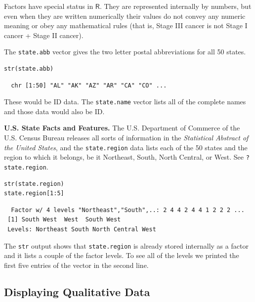 \documentclass[captions=tableheading]{scrbook}
\begin{document}
Factors have special status in \(\mathsf{R}\). They are represented internally by numbers, but even when they are written numerically their values do not convey any numeric meaning or obey any mathematical rules (that is, Stage III cancer is not Stage I cancer + Stage II cancer).

\begin{example}
The \texttt{state.abb}
vector gives the two letter postal abbreviations for all 50 states.


\begin{verbatim}
str(state.abb)
\end{verbatim}

\begin{verbatim}
  chr [1:50] "AL" "AK" "AZ" "AR" "CA" "CO" ...
\end{verbatim}

These would be ID data. The \texttt{state.name} vector lists all of the complete names and those data would also be ID.
\end{example}

\begin{example}
\textbf{U.S. State Facts and Features.} The U.S. Department of Commerce of the U.S. Census Bureau releases all sorts of information in the \emph{Statistical Abstract of the United States}, and the \texttt{state.region} data lists each of the 50 states and the region to which it belongs, be it Northeast, South, North Central, or West. See \texttt{?state.region}.


\begin{verbatim}
str(state.region)
state.region[1:5]
\end{verbatim}

\begin{verbatim}
  Factor w/ 4 levels "Northeast","South",..: 2 4 4 2 4 4 1 2 2 2 ...
 [1] South West  West  South West 
 Levels: Northeast South North Central West
\end{verbatim}

The \texttt{str} output shows that \texttt{state.region} is already stored internally as a factor and it lists a couple of the factor levels. To see all of the levels we printed the first five entries of the vector in the second line.
\end{example}
\subsection{Displaying Qualitative Data}
\label{sec-3-1-4}
\label{sub-Displaying-Qualitative-Data}
\end{document}
